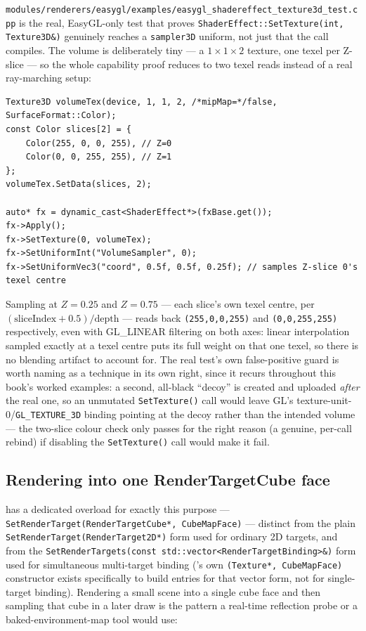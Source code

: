 \texttt{modules/renderers/easygl/examples/\allowbreak{}easygl\_shadereffect\_texture3d\_test.cpp} is the real, EasyGL-only test
that proves \texttt{ShaderEffect::SetTexture(int, Texture3D\&)} genuinely reaches a
\texttt{sampler3D} uniform, not just that the call compiles. The volume is deliberately
tiny --- a $1\times1\times2$ texture, one texel per Z-slice --- so the whole capability proof
reduces to two texel reads instead of a real ray-marching setup:

\begin{lstlisting}
Texture3D volumeTex(device, 1, 1, 2, /*mipMap=*/false, SurfaceFormat::Color);
const Color slices[2] = {
    Color(255, 0, 0, 255), // Z=0
    Color(0, 0, 255, 255), // Z=1
};
volumeTex.SetData(slices, 2);

auto* fx = dynamic_cast<ShaderEffect*>(fxBase.get());
fx->Apply();
fx->SetTexture(0, volumeTex);
fx->SetUniformInt("VolumeSampler", 0);
fx->SetUniformVec3("coord", 0.5f, 0.5f, 0.25f); // samples Z-slice 0's texel centre
\end{lstlisting}

Sampling at $Z=0.25$ and $Z=0.75$ --- each slice's own texel centre, per
$(\text{sliceIndex} + 0.5) / \text{depth}$ --- reads back \texttt{(255,0,0,255)} and
\texttt{(0,0,255,255)} respectively, even with GL\_LINEAR filtering on both axes: linear
interpolation sampled exactly at a texel centre puts its full weight on that one texel, so
there is no blending artifact to account for. The real test's own false-positive guard is
worth naming as a technique in its own right, since it recurs throughout this book's worked
examples: a second, all-black ``decoy''  is created and uploaded
\emph{after} the real one, so an unmutated \texttt{SetTexture()} call would leave GL's
texture-unit-0/\texttt{GL\_TEXTURE\_3D} binding pointing at the decoy rather than the
intended volume --- the two-slice colour check only passes for the right reason (a genuine,
per-call rebind) if disabling the \texttt{SetTexture()} call would make it fail.

\subsection{Rendering into one RenderTargetCube face}

 has a dedicated overload for exactly this purpose ---
\texttt{SetRenderTarget(RenderTargetCube*, CubeMapFace)} --- distinct from the plain
\texttt{SetRenderTarget(RenderTarget2D*)} form used for ordinary 2D targets, and from the
\texttt{SetRenderTargets(const std::vector<RenderTargetBinding>\&)} form used for
simultaneous multi-target binding ('s own
\texttt{(Texture*, CubeMapFace)} constructor exists specifically to build entries for that
vector form, not for single-target binding). Rendering a small scene into a single cube face
and then sampling that cube in a later draw is the pattern a real-time reflection probe or a
baked-environment-map tool would use:

